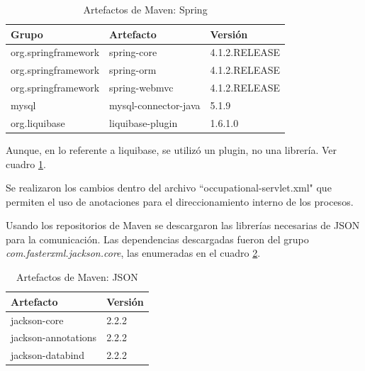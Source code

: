     \begin{table}[h!]
        
        \begin{center}
            \begin{tabular}{|l|l|l|}\hline
                Grupo & Artefacto & Versión \\\hline
                org.springframework & spring-core & 4.1.2.RELEASE \\\hline
                org.springframework & spring-orm & 4.1.2.RELEASE \\\hline
                org.springframework & spring-webmvc & 4.1.2.RELEASE \\\hline
                mysql & mysql-connector-java & 5.1.9 \\\hline
                org.liquibase & liquibase-plugin & 1.6.1.0 \\\hline
            \end{tabular}
        \end{center}
        
        \caption{Artefactos de Maven: Spring}
        \label{artefactos-spring}
    \end{table}
    
    Aunque, en lo referente a liquibase, se utilizó un plugin, no una librería. Ver cuadro \ref{artefactos-spring}.
    
    Se realizaron los cambios dentro del archivo ``occupational-servlet.xml" que permiten el uso de anotaciones para el direccionamiento interno de los procesos.
    
    Usando los repositorios de Maven se descargaron las librerías necesarias de JSON para la comunicación. Las dependencias descargadas fueron del grupo \textit{com.fasterxml.jackson.core}, las enumeradas en el cuadro \ref{artefactos-json}.
     
    \begin{table}[h!]
         
        \begin{center}
            \begin{tabular}{|l|l|}\hline
                Artefacto & Versión \\\hline
                jackson-core & 2.2.2 \\\hline
                jackson-annotations & 2.2.2 \\\hline
                jackson-databind & 2.2.2 \\\hline                   
            \end{tabular}
        \end{center}
        
        \caption{Artefactos de Maven: JSON}
        \label{artefactos-json}
    \end{table}
    
